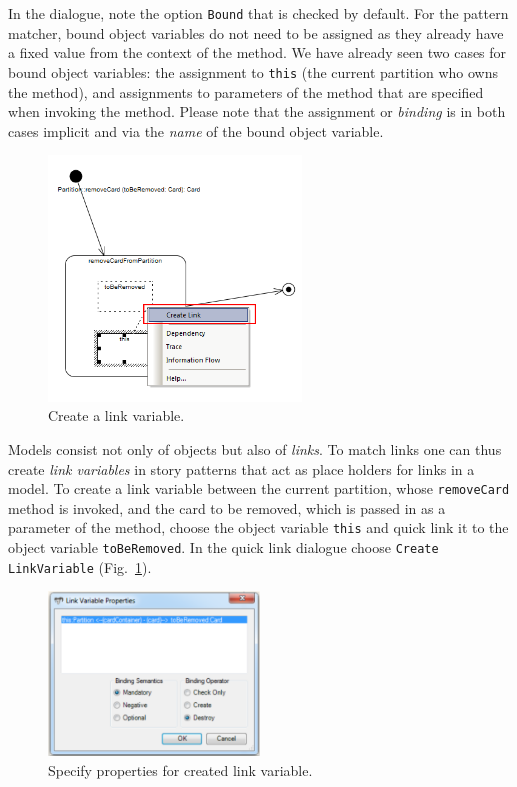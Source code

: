 In the dialogue, note the option \texttt{Bound} that is checked by default.
For the pattern matcher, bound object variables do not need to be assigned as
they already have a fixed value from the context of the method.  We have already
seen two cases  for bound object variables: the assignment to \texttt{this} (the
current  partition who owns the method), and assignments to parameters of the
method that  are specified when invoking the method.  Please note that the
assignment or \emph{binding} is in both cases implicit and via the \emph{name}
of the bound object variable. 

\begin{figure}[htp]
\begin{center}
  \includegraphics[width=0.6\textwidth]{pics/sdmBilder/removeCard/sdm11RAW}
  \caption{Create a link variable.}   
  \label{fig:link_variable}
\end{center}
\end{figure}

Models consist not only of objects but also of \emph{links}.  To match links one
can thus create \emph{link variables} in story patterns that act as place
holders for links in a model.  To create a link variable between the current
partition, whose \texttt{removeCard} method is invoked, and the card
to be removed, which is passed in as a parameter of the method, choose
the object variable \texttt{this} and quick link it to the object variable
\texttt{toBeRemoved}.  In the quick link dialogue choose \texttt{Create
LinkVariable} (Fig.~\ref{fig:link_variable}).

\begin{figure}[htp] 
\begin{center}
  \includegraphics[width=0.5\textwidth]{pics/sdmBilder/removeCard/sdm12RAW}
  \caption{Specify properties for created link variable.}  
  \label{fig:link_variable_properties}
\end{center}
\end{figure}

